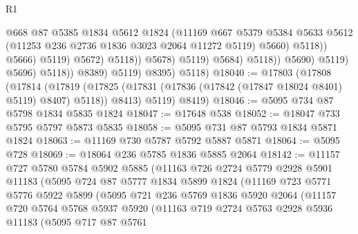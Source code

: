 \begin{lexlean}{R1}
\begin{coremodule}
                                              @668
                                              @87
                                              @5385
                                              @1834
                                              @5612
                                              @1824
                                              (@11169
                                                @667
                                                @5379
                                                @5384
                                                @5633
                                                @5612
                                                (@11253 @236 @2736 @1836 @3023 @2064 @11272 @5119)
                                                @5660)
                                              @5118))
                                          @5666)
                                        @5119)
                                      @5672)
                                    @5118))
                                @5678)
                              @5119)
                            @5684)
                          @5118))
                      @5690)
                    @5119)
                  @5696)
                @5118))
            @8389)
          @5119)
        @8395)
      @5118)
@18040 := @17803
    (@17808
      (@17814
        (@17819 (@17825 (@17831 (@17836 (@17842 (@17847 @18024 @8401) @5119) @8407) @5118)) @8413)
        @5119)
      @8419)
@18046 := @5095 @734 @87 @5798 @1834 @5835 @1824
@18047 := @17648 @538
@18052 := @18047 @733 @5795 @5797 @5873 @5835
@18058 := @5095 @731 @87 @5793 @1834 @5871 @1824
@18063 := @11169 @730 @5787 @5792 @5887 @5871
@18064 := @5095 @728
@18069 := @18064 @236 @5785 @1836 @5885 @2064
@18142 := @11157
    @727
    @5780
    @5784
    @5902
    @5885
    (@11163
      @726
      @2724
      @5779
      @2928
      @5901
      @11183
      (@5095
        @724
        @87
        @5777
        @1834
        @5899
        @1824
        (@11169
          @723
          @5771
          @5776
          @5922
          @5899
          (@5095
            @721
            @236
            @5769
            @1836
            @5920
            @2064
            (@11157
              @720
              @5764
              @5768
              @5937
              @5920
              (@11163
                @719
                @2724
                @5763
                @2928
                @5936
                @11183
                (@5095
                  @717
                  @87
                  @5761

\end{coremodule}
\end{lexlean}
